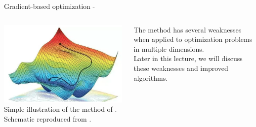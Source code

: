 \begin{frame}[t,allowframebreaks]{Gradient-based optimization -}
    \begin{columns}
        \begin{column}{0.80\textwidth}
            \begin{center}
                \includegraphics[width=0.99\textwidth]
                    {./images/grad_descent/guliyev20_grad_descent_2d.png}\\
                {\tiny 
                    Simple illustration of the method of
                    .
                    \color{col:attribution} 
                    Schematic reproduced from \cite{Medium:GradDescentOptLinReg}.\\
                }
            \end{center}                    
        \end{column}
        \begin{column}{0.20\textwidth}
        {\scriptsize
            The method has several weaknesses when applied to
            optimization problems in multiple dimensions.\\
            \vspace{0.2cm}
            Later in this lecture, 
            we will discuss these weaknesses and 
            improved algorithms.\\
        
        }    
        \end{column}
    \end{columns}

    \framebreak



\end{frame}
